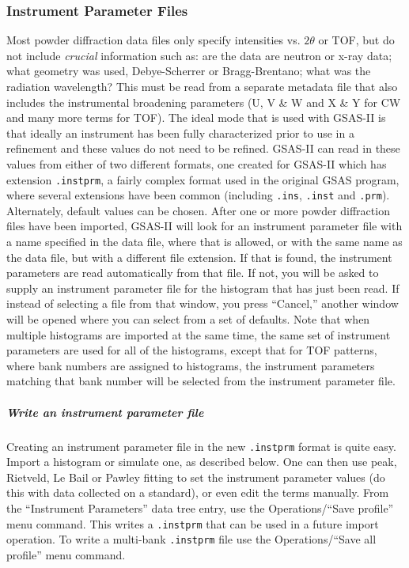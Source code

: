 \subsubsection{Instrument Parameter Files}
Most powder diffraction data files only specify intensities vs. $2\theta$ or TOF, but do not include \textit{crucial} information such as: are the data are neutron or x-ray data;  what geometry was used, Debye-Scherrer or Bragg-Brentano; what was the radiation wavelength? This must be read from a separate metadata file that also includes the instrumental broadening parameters (U, V \& W and X \& Y for CW and many more terms for TOF). The ideal mode that is used with GSAS-II is that ideally an instrument has been fully characterized prior to use in a refinement and these values do not need to be refined. GSAS-II can read in these values from either of two different formats, one created for GSAS-II which has extension \texttt{.instprm}, a fairly complex format used in the original GSAS program, where several extensions have been common (including  \texttt{.ins},  \texttt{.inst} and  \texttt{.prm}). Alternately, default values can be chosen. After one or more powder diffraction files have been imported, GSAS-II will look for an instrument parameter file with a name specified in the data file, where that is allowed, or with the same name as the data file, but with a different file extension. If that is found, the instrument parameters are read automatically from that file. If not, you will be asked to supply an instrument parameter file for the histogram that has just been read. If instead of selecting a file from that window, you press ``Cancel,'' another window will be opened where you can select from a set of defaults. Note that when multiple histograms are imported at the same time, the same set of instrument parameters are used for all of the histograms, except that for TOF patterns, where bank numbers are assigned to histograms, the instrument parameters matching that bank number will be selected from the instrument parameter file. 

\subparagraph{Write an instrument parameter file}
Creating an instrument parameter file in the new  \texttt{.instprm} format is quite easy. Import a histogram or simulate one, as described below. One can then use peak, Rietveld, Le Bail or Pawley fitting to set the instrument parameter values (do this with data collected on a standard), or even edit the terms manually. From the ``Instrument Parameters'' data tree entry, use the Operations/``Save profile'' menu command. 
This writes a \texttt{.instprm} that can be used in a future import operation. 
To write a multi-bank \texttt{.instprm} file use the Operations/``Save all profile'' menu command. 

